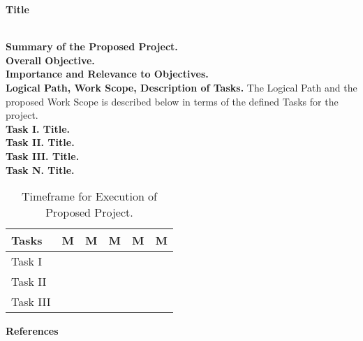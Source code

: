 \documentclass[11pt,letterpaper]{article}
\begin{document}
\begin{center}\textbf{Title}\end{center}\\

\noindent\textbf{Summary of the Proposed Project.} 
\\

\noindent\textbf{Overall Objective.}
\\

\noindent\textbf{Importance and Relevance to Objectives.}
\\

\noindent\textbf{Logical Path, Work Scope, Description of Tasks.} The Logical Path and the proposed Work Scope is described below in terms of the defined Tasks for the project.
\\

\noindent\textbf{Task I. Title.}
\\

\noindent\textbf{Task II. Title.}
\\

\noindent\textbf{Task III. Title.}
\\

\noindent\textbf{Task N. Title.}

\begin{table}[h!]
    \centering
    \caption{Timeframe for Execution of Proposed Project.}
    \begin{tabular}{|l|l|l|l|l|l|}
        \hline
        \textbf{Tasks} & \textbf{M} & \textbf{M} & \textbf{M} & \textbf{M} & \textbf{M} \\
        \hline
        Task I & & & & & \\
        \hline
        Task II & & & & & \\
        \hline
        Task III & & & & & \\
        \hline
    \end{tabular}
    \label{tab-timeframe}
\end{table}

\noindent\textbf{References}

\setlength{\bibhang}{0pt}

\end{document}
